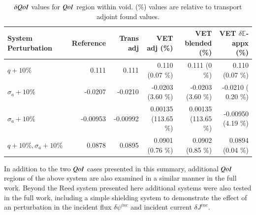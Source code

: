 \documentclass{anstrans}
\newcommand{\Edd}{\mathbb{E}}
\newcommand{\siga}{\sigma_a}
\newcommand{\qoi}{{\it QoI}\xspace}
\begin{document}
\begin{table}
  \centering
  \caption{$\delta \qoi$ values for $\qoi$ region within void. ($\%$) values are relative to transport adjoint found values.}
  \begin{tabular}{l|rr|rrr}\toprule
  System Perturbation    & Reference     & Trans adj     & VET adj \hspace{1mm} (\%)    &   VET blended \hspace{1mm} (\%)   & VET $\delta \Edd$-appx  \hspace{1mm} (\%) 
\\ \midrule
$q+10\%$  & 0.111   & 0.111   & 0.110 \hspace{1mm} (0.07 \%) & 0.111   \hspace{1mm} (0 \%) & 0.110 \hspace{1mm} (0.07 \%) 
\\
$\siga+10\%$  &-0.0207  & -0.0210 & -0.0203  \hspace{1mm} (3.60 \%)  & -0.0203 \hspace{1mm} (3.60 \%)  & -0.0210 \hspace{1mm} ( 0.20 \%) 
\\
$\siga+10\%$  & -0.00953   & -0.00992   & 0.00135   \hspace{1mm} (113.65 \%)  & 0.00135  \hspace{1mm} (113.65 \%)  & -0.00950 \hspace{1mm} (4.19 \%) 
\\
$q+10\%,\siga+10\%$  & 0.0878  & 0.0895  & 0.0901 \hspace{1mm} (0.76 \%)  & 0.0902 \hspace{1mm} (0.85 \%)   &  0.0894   \hspace{1mm} (0.04 \%) 
\\
\bottomrule
\end{tabular}
  \label{tab:qoi2}
\end{table}


In addition to the two $\qoi$ cases presented in this summary, additional $\qoi$ regions of the above system are also examined in a similar manner in the full work. Beyond the Reed system presented here additional systems were also tested in the full work, including a simple shielding system to demonstrate the effect of an perturbation in the incident flux $\delta \psi^{inc}$ and incident current $\delta J^{inc}$.



\end{document}
